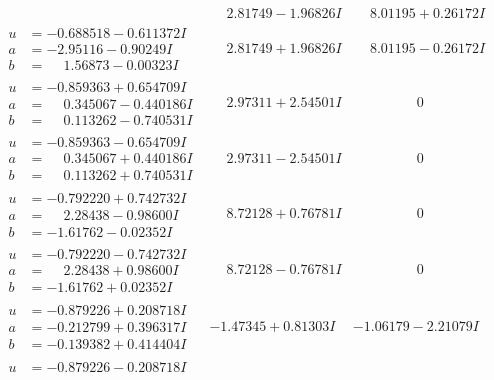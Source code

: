 \documentclass[1p]{elsarticle_modified}
\theoremstyle{definition}
\begin{document}
$$\begin{array}{c|c|c}
 & \phantom{-}2.81749 - 1.96826 I & \phantom{-}8.01195 + 0.26172 I \\ \hline\begin{aligned}
u &= -0.688518 - 0.611372 I \\
a &= -2.95116 - 0.90249 I \\
b &= \phantom{-}1.56873 - 0.00323 I\end{aligned}
 & \phantom{-}2.81749 + 1.96826 I & \phantom{-}8.01195 - 0.26172 I \\ \hline\begin{aligned}
u &= -0.859363 + 0.654709 I \\
a &= \phantom{-}0.345067 - 0.440186 I \\
b &= \phantom{-}0.113262 - 0.740531 I\end{aligned}
 & \phantom{-}2.97311 + 2.54501 I & \phantom{-0.000000 } 0 \\ \hline\begin{aligned}
u &= -0.859363 - 0.654709 I \\
a &= \phantom{-}0.345067 + 0.440186 I \\
b &= \phantom{-}0.113262 + 0.740531 I\end{aligned}
 & \phantom{-}2.97311 - 2.54501 I & \phantom{-0.000000 } 0 \\ \hline\begin{aligned}
u &= -0.792220 + 0.742732 I \\
a &= \phantom{-}2.28438 - 0.98600 I \\
b &= -1.61762 - 0.02352 I\end{aligned}
 & \phantom{-}8.72128 + 0.76781 I & \phantom{-0.000000 } 0 \\ \hline\begin{aligned}
u &= -0.792220 - 0.742732 I \\
a &= \phantom{-}2.28438 + 0.98600 I \\
b &= -1.61762 + 0.02352 I\end{aligned}
 & \phantom{-}8.72128 - 0.76781 I & \phantom{-0.000000 } 0 \\ \hline\begin{aligned}
u &= -0.879226 + 0.208718 I \\
a &= -0.212799 + 0.396317 I \\
b &= -0.139382 + 0.414404 I\end{aligned}
 & -1.47345 + 0.81303 I & -1.06179 - 2.21079 I \\ \hline\begin{aligned}
u &= -0.879226 - 0.208718 I \\

\end{aligned}
\end{array}$$
\end{document}
